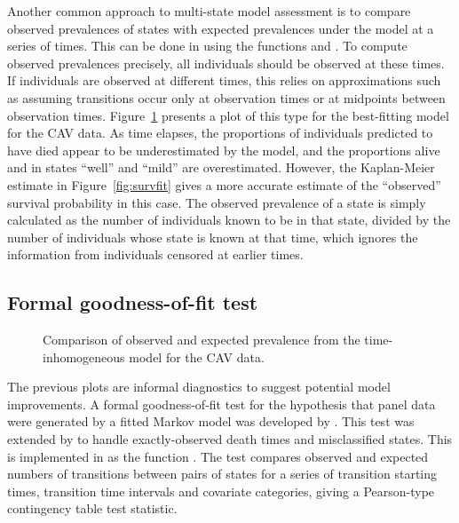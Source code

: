 \documentclass[article,shortnames]{jss}
\begin{document}
Another common approach to multi-state model assessment is to compare
observed prevalences of states with expected prevalences under the
model at a series of times.  This can be done in  using the
functions  and . To
compute observed prevalences precisely, all individuals should be
observed at these times.  If individuals are observed at different
times, this relies on approximations such as assuming transitions
occur only at observation times \citep{gentlaw} or at midpoints
between observation times.  Figure~\ref{fig:prev} presents a plot of
this type for the best-fitting model  for the CAV
data.  As time elapses, the proportions of individuals predicted to
have died appear to be underestimated by the model, and the
proportions alive and in states ``well'' and ``mild'' are
overestimated.  However, the Kaplan-Meier estimate in
Figure~\ref{fig:survfit} gives a more accurate estimate of the
``observed'' survival probability in this case.  The observed
prevalence of a state is simply calculated as the number of
individuals known to be in that state, divided by the number of
individuals whose state is known at that time, which ignores the
information from individuals censored at earlier times.


\subsection{Formal goodness-of-fit test}

\begin{figure}[t!]
  \centering
  \caption{Comparison of observed and expected prevalence from the time-inhomogeneous model  for the CAV data.\label{fig:prev}}
\end{figure}


The previous plots are informal diagnostics to suggest potential model
improvements.  A formal goodness-of-fit test for the hypothesis that
panel data were generated by a fitted Markov model was developed by
\citet{ahf}.  This test was extended by \citet{titman:sharples} to
handle exactly-observed death times and misclassified states.  This is
implemented in  as the function .  The
test compares observed and expected numbers of transitions between
pairs of states for a series of transition starting times, transition
time intervals and covariate categories, giving a Pearson-type
contingency table test statistic.
\end{document}
